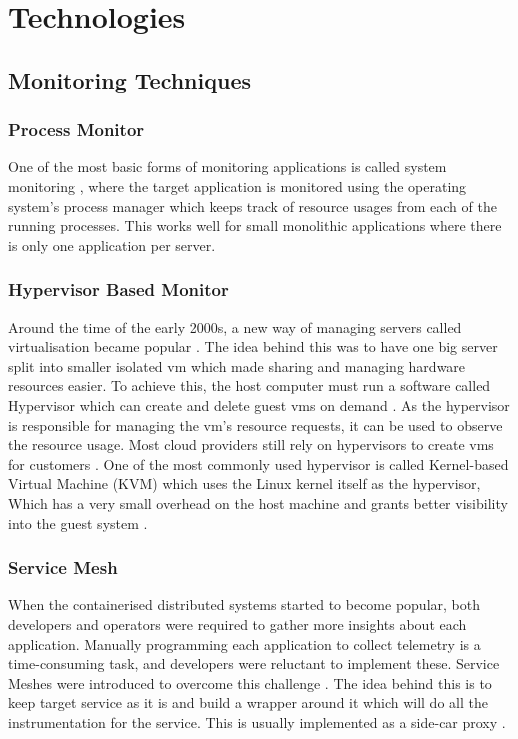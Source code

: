 \section{Technologies}

\subsection{Monitoring Techniques}

\subsubsection{Process Monitor}

One of the most basic forms of monitoring applications is called system monitoring \citep{WhatisaS27:online}, where the target application is monitored using the operating system's process manager which keeps track of resource usages from each of the running processes. This works well for small monolithic applications where there is only one application per server.

\subsubsection{Hypervisor Based Monitor}

Around the time of the early 2000s, a new way of managing servers called virtualisation became popular \citep{Whatisvi12:online}. The idea behind this was to have one big server split into smaller isolated \ac{vm} which made sharing and managing hardware resources easier. To achieve this, the host computer must run a software called Hypervisor which can create and delete guest \acp{vm} on demand \citep{Mergen_Uhlig_Krieger_Xenidis_2006}. As the hypervisor is responsible for managing the \ac{vm}'s resource requests, it can be used to observe the resource usage. Most cloud providers still rely on hypervisors to create \acp{vm} for customers \citep{7waysweh13:online}. One of the most commonly used hypervisor is called Kernel-based Virtual Machine (KVM) which uses the Linux kernel itself as the  hypervisor, Which has a very small overhead on the host machine and grants better visibility into the guest system \citep{kivity2007kvm}.

\subsubsection{Service Mesh} \label{sec:service-mesh}

When the containerised distributed systems started to become popular, both developers and operators were required to gather more insights about each application. Manually programming each application to collect telemetry is a time-consuming task, and developers were reluctant to implement these. Service Meshes were introduced to overcome this challenge \citep{li2019service}. The idea behind this is to keep target service as it is and build a wrapper around it which will do all the instrumentation for the service. This is usually implemented as a side-car proxy \citep{Whatissi48:online}. 

